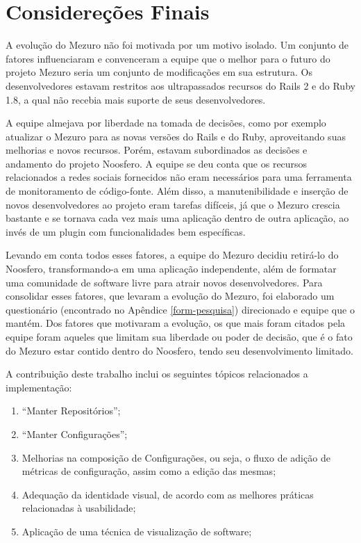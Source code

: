 \chapter{Considereções Finais}

A evolução do Mezuro não foi motivada por um motivo isolado. Um conjunto de fatores influenciaram e convenceram a equipe que o melhor para o futuro do projeto Mezuro seria um conjunto de modificações em sua estrutura. Os desenvolvedores estavam restritos aos ultrapassados recursos do Rails 2 e do Ruby 1.8, a qual não recebia mais suporte de seus desenvolvedores.

A equipe almejava por liberdade na tomada de decisões, como por exemplo atualizar o Mezuro para as novas versões do Rails e do Ruby, aproveitando suas melhorias e novos recursos. Porém, estavam subordinados as decisões e andamento do projeto Noosfero. A equipe se deu conta que os recursos relacionados a redes sociais fornecidos não eram necessários para uma ferramenta de monitoramento de código-fonte. Além disso, a manutenibilidade e inserção de novos desenvolvedores ao projeto eram tarefas difíceis, já que o Mezuro crescia bastante e se tornava cada vez mais uma aplicação dentro de outra aplicação, ao invés de um plugin com funcionalidades bem específicas.

Levando em conta todos esses fatores, a equipe do Mezuro decidiu retirá-lo do Noosfero, transformando-a em uma aplicação independente, além de formatar uma comunidade de software livre para atrair novos desenvolvedores. Para consolidar esses fatores, que levaram a evolução do Mezuro, foi elaborado um questionário (encontrado no Apêndice \ref{form-pesquisa}) direcionado e equipe que o mantém. Dos fatores que motivaram a evolução, os que mais foram citados pela equipe foram aqueles que limitam sua liberdade ou poder de decisão, que é o fato do Mezuro estar contido dentro do Noosfero, tendo seu desenvolvimento limitado.

A contribuição deste trabalho inclui os seguintes tópicos relacionados a implementação:
\begin{enumerate}
\item ``Manter Repositórios'';
\item ``Manter Configurações'';
\item Melhorias na composição de Configurações, ou seja, o fluxo de adição de métricas de configuração, assim como a edição das mesmas;
\item Adequação da identidade visual, de acordo com as melhores práticas relacionadas à usabilidade;
\item Aplicação de uma técnica de visualização de software;
\end{enumerate}

